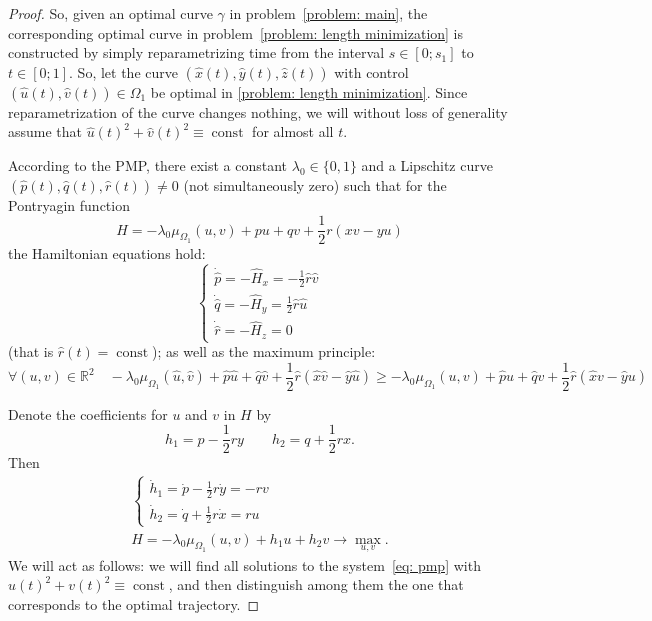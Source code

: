 \documentclass[a4paper,12pt]{article}
\DeclareMathOperator{\const}{const}
\newcommand {\R}{{\mathbb R}}
\theoremstyle{remark}
\theoremstyle{definition}
\begin{document}
\begin{proof}
	
	So, given an optimal curve $\gamma$ in problem~\eqref{problem: main}, the corresponding optimal curve in problem~\eqref{problem: length minimization} is constructed by simply reparametrizing time from the interval $s\in[0;s_1]$ to $t\in[0;1]$. So, let the curve $(\hat{x}(t), \hat{y}(t), \hat{z}(t))$ with control $(\hat{u}(t), \hat{v}(t))\in\Omega_1$ be optimal in \eqref{problem: length minimization}. Since reparametrization of the curve changes nothing, we will without loss of generality assume that $\hat u(t)^2+\hat v(t)^2\equiv\const$ for almost all $t$.
	
	According to the PMP, there exist a constant $\lambda_0\in\{0,1\}$ and a Lipschitz curve $(\hat{p}(t), \hat{q}(t), \hat{r}(t)) \neq 0$ (not simultaneously zero) such that for the Pontryagin function
	$$
	H = -\lambda_0\mu_{\Omega_1}(u,v) + pu + qv + \frac{1}{2} r (xv - yu)
	$$
	the Hamiltonian equations hold:
	$$
	\begin{cases} \dot{\hat{p}} = -\hat{H}_x = -\frac{1}{2}\hat{r}\hat{v} \\ \dot{\hat{q}} = -\hat{H}_y = \frac{1}{2}\hat{r}\hat{u} \\ \dot{\hat{r}} = -\hat{H}_z = 0 \end{cases}
	$$
	(that is $\hat{r}(t) = \const$); as well as the maximum principle:
	$$
	\forall (u, v) \in \R^2 \quad
	-\lambda_0\mu_{\Omega_1}(\hat u,\hat v) + \hat{p}\hat{u} + \hat{q}\hat{v} + \frac{1}{2}\hat{r}(\hat{x}\hat{v} - \hat{y}\hat{u}) \ge
	-\lambda_0\mu_{\Omega_1}(u,v)+\hat{p}u + \hat{q}v + \frac{1}{2}\hat{r}(\hat{x}v - \hat{y}u)
	$$
	
	Denote the coefficients for $u$ and $v$ in $H$ by
	$$
	h_1 = p - \frac{1}{2}ry \qquad h_2 = q + \frac{1}{2}rx.
	$$
	Then
	\begin{equation}
		\label{eq: pmp}
		\begin{gathered}
			\begin{cases}
				\dot{h}_1 = \dot{p} - \frac{1}{2}r\dot{y} = -rv \\
				\dot{h}_2 = \dot{q} + \frac{1}{2}r\dot{x} = ru
			\end{cases}\\
			H = - \lambda_0\mu_{\Omega_1}(u,v) + h_1u+h_2v\to\max_{u,v}.
		\end{gathered}
	\end{equation}
	We will act as follows: we will find all solutions to the system~\eqref{eq: pmp} with $u(t)^2+v(t)^2\equiv\const$, and then distinguish among them the one that corresponds to the optimal trajectory.
	

\end{proof}
\end{document}
